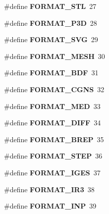 \begin{DoxyCompactItemize}
\item 
\#define {\bfseries F\-O\-R\-M\-A\-T\-\_\-\-S\-T\-L}~27\label{GmshDefines_8h_a2673896df840e64423fcd397031d2fec}

\item 
\#define {\bfseries F\-O\-R\-M\-A\-T\-\_\-\-P3\-D}~28\label{GmshDefines_8h_a43b43503779f0b2936c5062dffe97aeb}

\item 
\#define {\bfseries F\-O\-R\-M\-A\-T\-\_\-\-S\-V\-G}~29\label{GmshDefines_8h_ae2787b09b44dd6010ada3a45a4f1a926}

\item 
\#define {\bfseries F\-O\-R\-M\-A\-T\-\_\-\-M\-E\-S\-H}~30\label{GmshDefines_8h_ab8f53c83b89f64d6a4e5886277594598}

\item 
\#define {\bfseries F\-O\-R\-M\-A\-T\-\_\-\-B\-D\-F}~31\label{GmshDefines_8h_a87a6c23dc675bd44dee9824d5bad2af2}

\item 
\#define {\bfseries F\-O\-R\-M\-A\-T\-\_\-\-C\-G\-N\-S}~32\label{GmshDefines_8h_a70a403c5a1f2f5a874d3695197952c04}

\item 
\#define {\bfseries F\-O\-R\-M\-A\-T\-\_\-\-M\-E\-D}~33\label{GmshDefines_8h_a4f90ed3530abd2240fc2d3960e76ecbd}

\item 
\#define {\bfseries F\-O\-R\-M\-A\-T\-\_\-\-D\-I\-F\-F}~34\label{GmshDefines_8h_a67f5303bbc7f7847b53521741b193338}

\item 
\#define {\bfseries F\-O\-R\-M\-A\-T\-\_\-\-B\-R\-E\-P}~35\label{GmshDefines_8h_a309c24826bbd80a314c56fd85018b084}

\item 
\#define {\bfseries F\-O\-R\-M\-A\-T\-\_\-\-S\-T\-E\-P}~36\label{GmshDefines_8h_a6ce2061c2abc72f4edc11aec75cdbb87}

\item 
\#define {\bfseries F\-O\-R\-M\-A\-T\-\_\-\-I\-G\-E\-S}~37\label{GmshDefines_8h_a9d99801e188e3312a589f6f39858ed1d}

\item 
\#define {\bfseries F\-O\-R\-M\-A\-T\-\_\-\-I\-R3}~38\label{GmshDefines_8h_a8ce82cca581222d03b6fdca9d5e9bbdc}

\item 
\#define {\bfseries F\-O\-R\-M\-A\-T\-\_\-\-I\-N\-P}~39\label{GmshDefines_8h_aca80e800f5ead32a1522578c763f36e9}


\end{DoxyCompactItemize}
